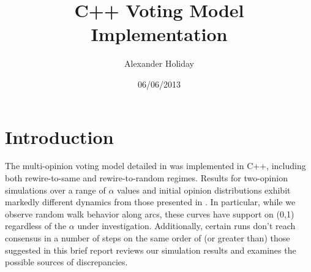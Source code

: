 \documentclass[11pt]{article}
\begin{document}
\title{C++ Voting Model Implementation}
\author{Alexander Holiday\vspace{-2ex}}
\date{06/06/2013}
\maketitle
\section*{Introduction}
The multi-opinion voting model detailed in \cite{durret:pnas12} was implemented in C++, including both rewire-to-same and rewire-to-random regimes. Results for two-opinion simulations over a range of $\alpha$ values and initial opinion distributions exhibit markedly different dynamics from those presented in \cite{durret:pnas12}. In particular, while we observe random walk behavior along arcs, these curves have support on (0,1) regardless of the $\alpha$ under investigation. Additionally, certain runs don't reach consensus in a number of steps on the same order of (or greater than) those suggested in \cite{durret:pnas12} this brief report reviews our simulation results and examines the possible sources of discrepancies.
\end{document}
